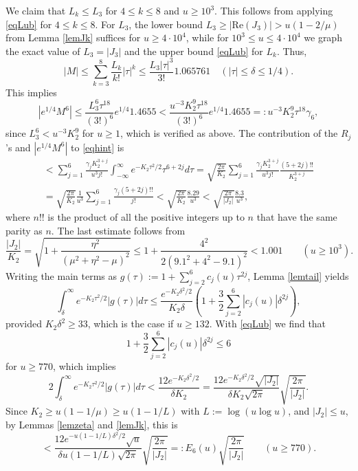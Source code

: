 \documentclass[11pt]{amsart}
\begin{document}
We claim that $L_{k}\le L_3$ for $4\le k \le 8$ and $u\ge 10^3$. This follows from applying \eqref{eqLub} for $4\le k \le 8$. For
$L_3$, the lower bound $L_3\ge |\mathrm{Re}(J_3)|>u(1-2/\mu)$ from Lemma \ref{lemJk} suffices for $u\ge 4\cdot 10^4$, 
while for $10^3\le u \le  4\cdot 10^4$ we graph
the exact value of $L_3=|J_3|$ and the upper bound \eqref{eqLub} for $L_k$.  Thus,
$$
|M|\le \sum_{k=3}^8 \frac{L_k}{k!}|\tau|^k \le \frac{L_3 |\tau|^3}{3!} 1.065761 \quad  (|\tau|\le \delta \le 1/4).
$$
This implies 
$$
|e^{1/4} M^6| \le \frac{L_3^6 \tau^{18}}{(3!)^6} e^{1/4} 1.4655 <  \frac{u^{-3} K_2^9 \tau^{18}}{(3!)^6} e^{1/4} 1.4655
 =: u^{-3} K_2^9 \tau^{18} \gamma_6,
$$
since $L_3^6< u^{-3}K_2^9$ for $u\ge 1$, which is verified as above.
The contribution of the $R_j$'s and $|e^{1/4} M^6|$ to \eqref{eqhint} is 
\begin{multline*}
< \sum_{j=1}^6 \frac{\gamma_j  K_2^{3+j}}{u^3 j!} \int_{-\infty}^\infty e^{-K_2\tau^2/2} \tau^{6+2j} d\tau
= \sqrt{\frac{2\pi}{K_2}}\sum_{j=1}^6 \frac{\gamma_j  K_2^{3+j}}{u^3 j!} \frac{(5+2j)!!}{K_2^{3+j}}\\
= \sqrt{\frac{2\pi}{K_2}}\frac{1}{u^3}\sum_{j=1}^6 \frac{\gamma_j (5+2j)!!}{j!}
< \sqrt{\frac{2\pi}{K_2}} \frac{8.29}{u^3}< \sqrt{\frac{2\pi}{|J_2|}} \frac{8.3}{u^3},
\end{multline*}
where $n!!$ is the product of all the positive integers up to $n$ that have the same parity as $n$.
The last estimate follows from 
$$\frac{|J_2|}{K_2}=\sqrt{1+\frac{\eta^2}{(\mu^2+\eta^2-\mu)^2}} \le 
1+\frac{4^2}{2(9.1^2+4^2-9.1)^2} < 1.001 \qquad (u\ge 10^3). 
$$
Writing the main terms as 
$g(\tau):=1+\sum_{j=2}^6 c_j(u) \tau^{2j}$, Lemma \ref{lemtail} yields
$$
\int_\delta^\infty  e^{-K_2\tau^2/2} |g(\tau)| d\tau 
\le \frac{e^{-K_2 \delta^2/2}}{K_2\delta} \left(1 + \frac{3}{2}\sum_{j=2}^6 |c_j(u)| \delta^{2j} \right) , 
$$
provided $K_2 \delta^2 \ge 33$, which is the case if $u\ge 132$. 
With \eqref{eqLub} we find that
$$
1 + \frac{3}{2}\sum_{j=2}^6 |c_j(u)| \delta^{2j} \le 6
$$
for $u\ge 770$, which implies
$$
2\int_\delta^\infty  e^{-K_2\tau^2/2}|g(\tau)| d\tau 
<\frac{12 e^{-K_2 \delta^2/2}}{\delta K_2} = \frac{ 12e^{-K_2 \delta^2/2} \sqrt{|J_2|}}{ \delta K_2  \sqrt{2\pi}} \sqrt{\frac{2\pi}{ |J_2|}}  .
$$
Since $K_2 \ge u(1-1/\mu)\ge u(1-1/L)$ with $L:=\log(u\log u)$, and $|J_2| \le u$, by Lemmas \ref{lemzeta} and \ref{lemJk}, this is
$$
< \frac{ 12e^{-u(1-1/L)\delta^2/2} \sqrt{u}}{ \delta u(1-1/L)  \sqrt{2\pi}} \sqrt{\frac{2\pi}{ |J_2|}} 
=: E_6(u)  \sqrt{\frac{2\pi}{ |J_2|}} \qquad (u\ge 770).
$$
\end{document}
